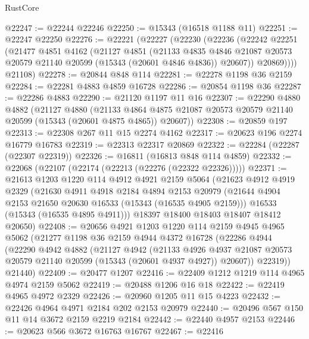 \begin{lexlean}{RustCore}
\begin{coremodule}
@22247 := @22244 @22246
@22250 := @15343 (@16518 @1188 @11)
@22251 := @22247 @22250
@22276 := @22221
    (@22227
      (@22230
        (@22236
          (@22242
            @22251
            (@21477
              @4851
              @4162
              (@21127
                @4851
                (@21133
                  @4835
                  @4846
                  @21087
                  @20573
                  @20579
                  @21140
                  @20599
                  (@15343 (@20601 @4846 @4836))
                  @20607))
              @20869))))
      @21108)
@22278 := @20844 @848 @114
@22281 := @22278 @1198 @36 @2159
@22284 := @22281 @4883 @4859 @16728
@22286 := @20854 @1198 @36
@22287 := @22286 @4883
@22290 := @21120 @1197 @11 @16
@22307 := @22290
    @4880
    @4882
    (@21127
      @4880
      (@21133 @4864 @4875 @21087 @20573 @20579 @21140 @20599 (@15343 (@20601 @4875 @4865)) @20607))
@22308 := @20859 @197
@22313 := @22308 @267 @11 @15 @2274 @4162
@22317 := @20623 @196 @2274 @16779 @16783
@22319 := @22313 @22317 @20869
@22322 := @22284 (@22287 (@22307 @22319))
@22326 := @16811 (@16813 @848 @114 @4859)
@22332 := @22068 (@22107 (@22174 (@22213 (@22276 (@22322 @22326)))))
@22371 := @21613
    @1203
    @1220
    @114
    @4912
    @4921
    @2159
    @5064
    (@21623
      @4912
      @4919
      @2329
      (@21630
        @4911
        @4918
        @2184
        @4894
        @2153
        @20979
        (@21644 @4904 @2153 @21650 @20630 @16533 (@15343 (@16535 @4905 @2159)))
        @16533
        (@15343 (@16535 @4895 @4911)))
      @18397
      @18400
      @18403
      @18407
      @18412
      @20650)
@22408 := @20656
    @4921
    @1203
    @1220
    @114
    @2159
    @4945
    @4965
    @5062
    (@21277
      @1198
      @36
      @2159
      @4944
      @4372
      @16728
      (@22286
        @4944
        (@22290
          @4942
          @4882
          (@21127
            @4942
            (@21133
              @4926
              @4937
              @21087
              @20573
              @20579
              @21140
              @20599
              (@15343 (@20601 @4937 @4927))
              @20607))
          @22319))
      @21440)
@22409 := @20477 @1207
@22416 := @22409 @1212 @1219 @114 @4965 @4974 @2159 @5062
@22419 := @20488 @1206 @16 @18
@22422 := @22419 @4965 @4972 @2329
@22426 := @20960 @1205 @11 @15 @4223
@22432 := @22426 @4964 @4971 @2184 @202 @2153 @20979
@22440 := @20496 @567 @150 @11 @14 @3672 @2159 @2219 @2184
@22442 := @22440 @4957 @2153
@22446 := @20623 @566 @3672 @16763 @16767
@22467 := @22416

\end{coremodule}
\end{lexlean}
